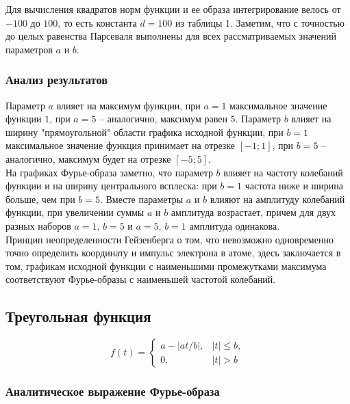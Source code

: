 \documentclass[a5paper, 10pt]{article}
\theoremstyle{definition}
\theoremstyle{plain}
\theoremstyle{remark}
\begin{document}
Для вычисления квадратов норм функции и ее образа интегрирование велось от $-100$ до $100$, то есть константа $d=100$ из таблицы 1. Заметим, что с точностью до целых равенства Парсеваля выполнены для всех рассматриваемых значений параметров $a$ и $b$.

\subsubsection{Анализ результатов}

Параметр $a$ влияет на максимум функции, при $a = 1$ максимальное значение функции $1$, при $a = 5$ -- аналогично, максимум равен $5$. Параметр $b$ влияет на ширину "прямоугольной" области графика исходной функции, при $b=1$ максимальное значение функция принимает на отрезке $[-1;1]$, при $b=5$ -- аналогично, максимум будет на отрезке $[-5; 5]$.\\
На графиках Фурье-образа заметно, что параметр $b$ влияет на частоту колебаний функции и на ширину центрального всплеска: при $b=1$ частота ниже и ширина больше, чем при $b=5$. Вместе параметры $a$ и $b$ влияют на амплитуду колебаний функции, при увеличении суммы $a$ и $b$ амплитуда возрастает, причем для двух разных наборов $a = 1, \, b=5$ и $a=5, \, b=1$ амплитуда одинакова.\\
Принцип неопределенности Гейзенберга о том, что невозможно одновременно точно определить координату и импульс электрона в атоме, здесь заключается в том, графикам исходной функции с наименьшими промежутками максимума соответствуют Фурье-образы с наименьшей частотой колебаний.







\newpage
\subsection{Треугольная функция}

\begin{equation}
f(t) =
\begin{cases}
a - |at / b|, & |t| \leq b,\\
0, & |t| > b
\end{cases}
\end{equation}


\subsubsection{Аналитическое выражение Фурье-образа}
\end{document}
